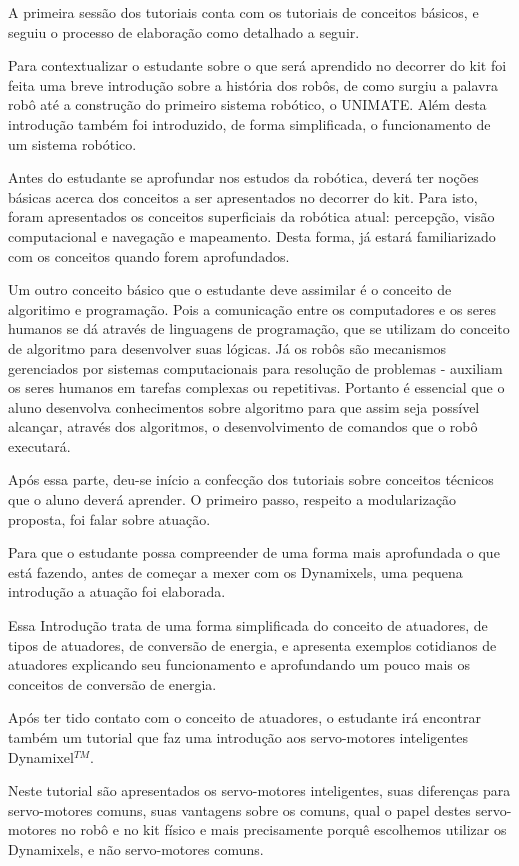 A primeira sessão dos tutoriais conta com os tutoriais de conceitos básicos, e seguiu o processo de elaboração como detalhado a seguir.

Para contextualizar o estudante sobre o que será aprendido no decorrer do kit foi feita uma breve introdução sobre a história dos robôs, de como surgiu a palavra robô até a construção do primeiro sistema robótico, o UNIMATE. Além desta introdução também foi introduzido, de forma simplificada, o funcionamento de um sistema robótico.

Antes do estudante se aprofundar nos estudos da robótica, deverá ter noções básicas acerca dos conceitos a ser apresentados no decorrer do kit. Para isto, foram apresentados os conceitos superficiais da robótica atual: percepção, visão computacional e navegação e mapeamento. Desta forma, já estará familiarizado com os conceitos quando forem aprofundados.

Um outro conceito básico que o estudante deve assimilar é o conceito de algoritimo e programação. Pois a comunicação entre os computadores e os seres humanos se dá através de linguagens de programação, que se utilizam do conceito de algoritmo para desenvolver suas lógicas. Já os robôs são mecanismos gerenciados por sistemas computacionais para resolução de problemas - auxiliam os seres humanos em tarefas complexas ou repetitivas. Portanto é essencial que o aluno desenvolva conhecimentos sobre algoritmo para que assim seja possível alcançar, através dos algoritmos, o desenvolvimento de comandos que o robô executará.

Após essa parte, deu-se início a confecção dos tutoriais sobre conceitos técnicos que o aluno deverá aprender. O primeiro passo, respeito a modularização proposta, foi falar sobre atuação.

Para que o estudante possa compreender de uma forma mais aprofundada o que está fazendo, antes de começar a mexer com os Dynamixels, uma pequena introdução a atuação foi elaborada.

Essa Introdução trata de uma forma simplificada do conceito de atuadores, de tipos de atuadores, de conversão de energia, e apresenta exemplos cotidianos de atuadores explicando seu funcionamento e aprofundando um pouco mais os conceitos de conversão de energia. \cite{tutAtua}

Após ter tido contato com o conceito de atuadores, o estudante irá encontrar também um tutorial que faz uma introdução aos servo-motores inteligentes Dynamixel$^{TM}$.

Neste tutorial são apresentados os servo-motores inteligentes, suas diferenças para servo-motores comuns, suas vantagens sobre os comuns, qual o papel destes servo-motores no robô e no kit físico e mais precisamente porquê escolhemos utilizar os Dynamixels, e não servo-motores comuns. \cite{tutDyna}

